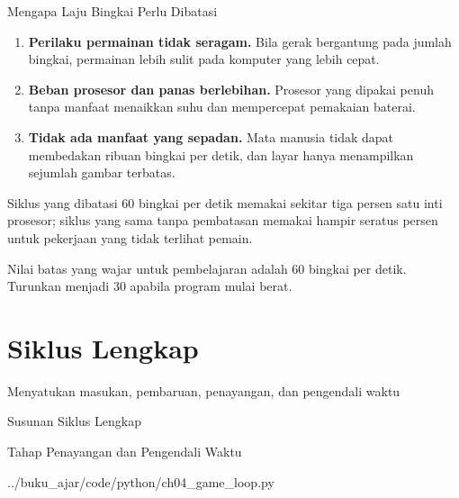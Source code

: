 \documentclass[aspectratio=169,10pt]{beamer}
\begin{document}
\begin{frame}{Mengapa Laju Bingkai Perlu Dibatasi}
\begin{enumerate}
  \item \textbf{Perilaku permainan tidak seragam.} Bila gerak bergantung pada
        jumlah bingkai, permainan lebih sulit pada komputer yang lebih cepat.
  \item \textbf{Beban prosesor dan panas berlebihan.} Prosesor yang dipakai
        penuh tanpa manfaat menaikkan suhu dan mempercepat pemakaian baterai.
  \item \textbf{Tidak ada manfaat yang sepadan.} Mata manusia tidak dapat
        membedakan ribuan bingkai per detik, dan layar hanya menampilkan
        sejumlah gambar terbatas.
\end{enumerate}
\begin{kotak}
Siklus yang dibatasi 60 bingkai per detik memakai sekitar tiga persen satu inti
prosesor; siklus yang sama tanpa pembatasan memakai hampir seratus persen untuk
pekerjaan yang tidak terlihat pemain.
\end{kotak}
\begin{kiat}
Nilai batas yang wajar untuk pembelajaran adalah 60 bingkai per detik.
Turunkan menjadi 30 apabila program mulai berat.
\end{kiat}
\end{frame}

\section{Siklus Lengkap}
  {Menyatukan masukan, pembaruan, penayangan, dan pengendali waktu}

\begin{frame}{Susunan Siklus Lengkap}
\centering
{}
\par\vspace{0.10cm}
\end{frame}

\begin{frame}[fragile]{Tahap Penayangan dan Pengendali Waktu}

  {../buku_ajar/code/python/ch04_game_loop.py}
\end{frame}
\end{document}
